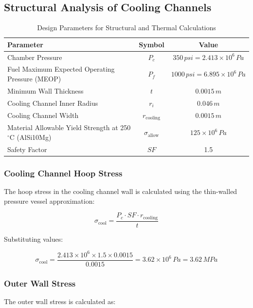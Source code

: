 \subsection{Structural Analysis of Cooling Channels}


\begin{table}[H]
\centering
\begin{tabular}{|l|c|c|}
\hline
\textbf{Parameter} & \textbf{Symbol} & \textbf{Value} \\ 
\hline
Chamber Pressure & $P_c$ & $350 \, \si{psi} = 2.413 \times 10^6 \, \si{Pa}$ \\ 
\hline
Fuel Maximum Expected Operating Pressure (MEOP) & $P_f$ & $1000 \, \si{psi} = 6.895 \times 10^6 \, \si{Pa}$ \\ 
\hline
Minimum Wall Thickness & $t$ & $0.0015 \, \si{m}$ \\ 
\hline
Cooling Channel Inner Radius & $r_i$ & $0.046 \, \si{m}$ \\ 
\hline
Cooling Channel Width & $r_{\text{cooling}}$ & $0.0015 \, \si{m}$ \\ 
\hline
Material Allowable Yield Strength at 250$^\circ$C (AlSi10Mg) & $\sigma_{\text{allow}}$ & $125 \times 10^6 \, \si{Pa}$ \\ 
\hline
Safety Factor & $SF$ & 1.5 \\ 
\hline
\end{tabular}
\caption{Design Parameters for Structural and Thermal Calculations}
\label{tab:given_parameters}
\end{table}


\subsubsection{Cooling Channel Hoop Stress}

The hoop stress in the cooling channel wall is calculated using the thin-walled pressure vessel approximation:

\[
\sigma_{\text{cool}} = \frac{P_c \cdot SF \cdot r_{\text{cooling}}}{t}
\]

Substituting values:

\[
\sigma_{\text{cool}} = \frac{2.413 \times 10^6 \times 1.5 \times 0.0015}{0.0015} = 3.62 \times 10^6 \, \si{Pa} = 3.62 \, \si{MPa}
\]

\subsubsection{Outer Wall Stress}

The outer wall stress is calculated as:

